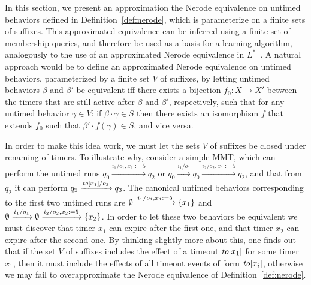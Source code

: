 In this section, we present an approximation the Nerode equivalence on
untimed behaviors
defined in Definition~\ref{def:nerode}, which is parameterize on a
finite sets of suffixes. This
approximated equivalence can be inferred using a finite set of membership
queries, and therefore be used as a basis for a learning algorithm,
analogously to the use of an approximated Nerode equivalence in
$L^*$~\cite{Ang87}.
A natural approach
would be to define an approximated Nerode equivalence on untimed behaviors,
parameterized by a finite set $V$ of suffixes, by letting 
untimed behaviors $\beta$ and $\beta'$ be equivalent
iff there exists a bijection 
$f_0 : X \to X'$ between the timers that are still active after
$\beta$ and $\beta'$, respectively,
such that for any untimed behavior $\gamma \in V$:
if $\beta \cdot \gamma \in S$ then there exists an isomorphism $f$ that extends $f_0$ such that $\beta' \cdot f(\gamma) \in S$, and vice versa.

In order to make this idea work, we must let the sets $V$ of suffixes be
closed under renaming of timers. 
To illustrate why, consider a simple MMT, which can perform the untimed runs
\(
q_0 \xrightarrow{i_1/o_1, x_1:= 5} q_2
\)
or
\(
q_0 \xrightarrow{i_1/o_1} q_0 \xrightarrow{i_2/o_2, x_1:= 5} q_2
\),
and that from $q_2$ it can perform
\(
q_2 \xrightarrow{\mathit{to}[x_1]/o_3} q_3
\).
The canonical untimed behaviors corresponding to the first two
untimed runs are
\(
\emptyset \xrightarrow{i_1/o_1, x_1:= 5} \lbrace x_1\rbrace
\)
and
\(
\emptyset \xrightarrow{i_1/o_1} \emptyset \xrightarrow{i_2/o_2, x_2:= 5} \lbrace x_2\rbrace
\).
In order to let these two behaviors be equivalent we must discover that
timer $x_1$ can expire after the first one, and that
timer $x_2$ can expire after the second one. By thinking slightly more about
this, one finds out that if the set $V$ of suffixes includes
the effect of a timeout $\mathit{to}[x_1]$ for some timer $x_1$, then it must
include the effects of all timeout events of form $\mathit{to}[x_i]$, otherwise we
may fail to overapproximate the Nerode equivalence of Definition~\ref{def:nerode}.



